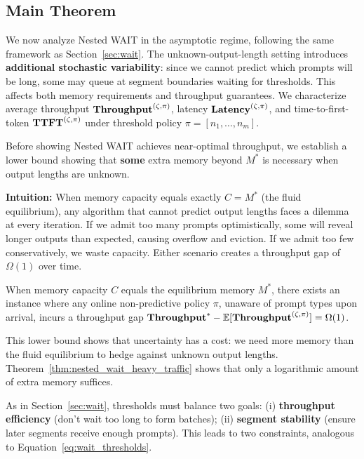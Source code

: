 \subsection{Main Theorem}
\label{subsec:nested_main_theorem}

We now analyze Nested WAIT in the asymptotic regime, following the same framework as Section~\ref{sec:wait}. The unknown-output-length setting introduces \textbf{additional stochastic variability}: since we cannot predict which prompts will be long, some may queue at segment boundaries waiting for thresholds. This affects both memory requirements and throughput guarantees. We characterize average throughput $\textbf{Throughput}^{(\zeta, \pi)}$, latency $\textbf{Latency}^{(\zeta, \pi)}$, and time-to-first-token $\textbf{TTFT}^{(\zeta, \pi)}$ under threshold policy $\pi = [n_1, \dots, n_m]$.

Before showing Nested WAIT achieves near-optimal throughput, we establish a lower bound showing that \textbf{some} extra memory beyond $M^*$ is necessary when output lengths are unknown.

\textbf{Intuition:} When memory capacity equals exactly $C = M^*$ (the fluid equilibrium), any algorithm that cannot predict output lengths faces a dilemma at every iteration. If we admit too many prompts optimistically, some will reveal longer outputs than expected, causing overflow and eviction. If we admit too few conservatively, we waste capacity. Either scenario creates a throughput gap of $\Omega(1)$ over time.

\begin{proposition}
\label{prop:unknown_lower_bound}
When memory capacity \( C \) equals the equilibrium memory \( M^* \), there exists an instance where any online non-predictive policy \( \pi \), unaware of prompt types upon arrival, incurs a throughput gap \( \textbf{Throughput}^* - \mathbb{E}[\textbf{Throughput}^{(\zeta, \pi)}] = \Omega(1) \).
\end{proposition}

This lower bound shows that uncertainty has a cost: we need more memory than the fluid equilibrium to hedge against unknown output lengths. Theorem~\ref{thm:nested_wait_heavy_traffic} shows that only a logarithmic amount of extra memory suffices.



As in Section~\ref{sec:wait}, thresholds must balance two goals: (i) \textbf{throughput efficiency} (don't wait too long to form batches); (ii) \textbf{segment stability} (ensure later segments receive enough prompts). This leads to two constraints, analogous to Equation~\eqref{eq:wait_thresholds}.

